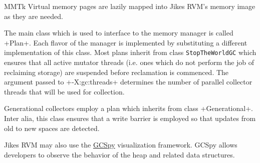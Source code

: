 \begin{chapter}{MMTk}
Virtual memory pages are lazily mapped into Jikes RVM's memory image as they are needed.

The main class which is used to interface to the memory manager is called \spverb+Plan+. Each flavor of the manager is implemented by substituting a different implementation of this class. Most plans inherit from class \texttt{Stop\-The\-World\-GC} which ensures that all active mutator threads (i.e. ones which do not perform the job of reclaiming storage) are suspended before reclamation is commenced. The argument passed to \spverb+-X:gc:threads+ determines the number of parallel collector threads that will be used for collection.

Generational collectors employ a plan which inherits from class \spverb+Generational+. Inter alia, this class ensures that a write barrier is employed so that updates from old to new spaces are detected.

Jikes RVM may also use the \hyperref[sec:usinggcspy]{GCSpy} visualization framework. GCSpy allows developers to observe the behavior of the heap and related data structures.










\end{chapter}
